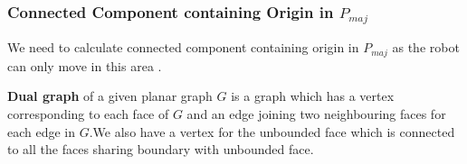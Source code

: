 \documentclass{beamer}
\begin{document}


\frame
{
\frametitle{Connected Component containing Origin in $P_{maj}$}
We need to calculate connected component containing origin in $P_{maj}$ as the robot can only move in this area \vspace{0.2in}. 

{\bf Dual graph} of a given planar graph $G$ is a graph which has a vertex corresponding to each face of $G$ and an edge joining two neighbouring faces for each edge in $G$.We also have
a vertex for the unbounded face which is connected to all the faces sharing boundary with unbounded face.  

}
  
\end{document}
